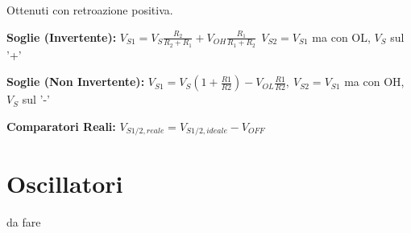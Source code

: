 \documentclass[12pt]{extarticle}
\begin{document}
Ottenuti con retroazione positiva.

{\bf Soglie (Invertente):} $\displaystyle V_{S1} = V_S\frac{R_2}{R_2+R_1}+V_{OH}\frac{R_1}{R_1+R_2} \ \ V_{S2} = V_{S1} $ ma con OL, $V_S$ sul '+'

{\bf Soglie (Non Invertente):} $\displaystyle V_{S1} = V_S(1+\frac{R1}{R2}) - V_{OL}\frac{R1}{R2}, \ V_{S2} = V_{S1}$ ma con OH, $V_S$ sul '-'

{\bf Comparatori Reali:} $\displaystyle V_{S1/2, reale} = V_{S1/2, ideale}-V_{OFF}$

\section{Oscillatori}

da fare
\end{document}
